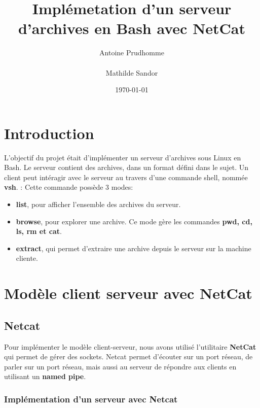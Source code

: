 \documentclass[titlepage]{article}
\begin{document}
	\title{Implémetation d'un serveur d'archives en Bash avec NetCat}
	\author{Antoine Prudhomme \\ \\ Mathilde Sandor}
	\date{\today}

	\maketitle

	\tableofcontents
	\newpage

	\section{Introduction}
	L'objectif du projet était d'implémenter un serveur d'archives sous Linux en Bash.
	Le serveur contient des archives, dans un format défini dans le sujet. 
	Un client peut intéragir avec le serveur au travers d'une commande shell, nommée \textbf{vsh}. :
	Cette commande possède 3 modes:
	\begin{itemize}  
	\item \textbf{list}, pour afficher l'ensemble des archives du serveur.
	\item \textbf{browse}, pour explorer une archive. Ce mode gère les commandes \textbf{pwd, cd, ls, rm et cat}.
	\item \textbf{extract}, qui permet d'extraire une archive depuis le serveur sur la machine cliente.
	\end{itemize}   

	\section{Modèle client serveur avec NetCat}
	
	\subsection{Netcat} 
	Pour implémenter le modèle client-serveur, nous avons utilisé l'utilitaire \textbf{NetCat} qui permet de gérer des sockets.
	Netcat permet d'écouter sur un port réseau, de parler sur un port réseau, mais aussi au serveur de répondre aux clients en utilisant un \textbf{named pipe}.

	\subsubsection{Implémentation d'un serveur avec Netcat}
\end{document}
